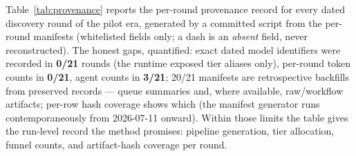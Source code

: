 \documentclass[11pt]{article}
\begin{document}
Table~\ref{tab:provenance} reports the per-round provenance record for every dated discovery round
of the pilot era, generated by a committed script from the per-round manifests (whitelisted fields
only; a dash is an \emph{absent} field, never reconstructed). The honest gaps, quantified:
exact dated model identifiers were recorded in \textbf{0/21} rounds (the runtime exposed tier
aliases only), per-round token counts in \textbf{0/21}, agent counts in \textbf{3/21}; 20/21
manifests are retrospective backfills from preserved records --- queue summaries and, where
available, raw/workflow artifacts; per-row hash coverage shows which (the manifest generator runs
contemporaneously from 2026-07-11 onward). Within those limits the table gives the run-level
record the method promises: pipeline generation, tier allocation, funnel counts, and artifact-hash
coverage per round.
\end{document}

